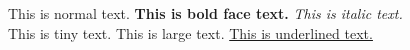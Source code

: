 \documentclass{article}
\date=06
\begin{document}
This is normal text. 
\newline
\textbf{This is bold face text. }
\textit{This is italic text. }\\
\tiny{This is tiny text. }
\large{This is large text. }
\underline{This is underlined text.}
\end{document}
